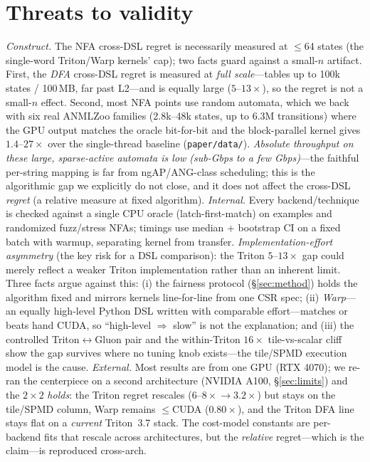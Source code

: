 \documentclass[conference]{IEEEtran}
\begin{document}
\section{Threats to validity}
\emph{Construct.} The NFA cross-DSL regret is necessarily measured at $\le$64 states (the
single-word Triton/Warp kernels' cap); two facts guard against a small-$n$ artifact. First, the
\emph{DFA} cross-DSL regret is measured at \emph{full scale}---tables up to 100k states / 100\,MB,
far past L2---and is equally large ($5$--$13\times$), so the regret is not a small-$n$ effect.
Second, most NFA points use random automata, which we back with six real ANMLZoo families
(2.8k--48k states, up to 6.3M transitions) where the GPU output matches the oracle bit-for-bit
and the block-parallel kernel gives $1.4$--$27\times$ over the single-thread baseline
(\texttt{paper/data/}).
\emph{Absolute throughput on these large, sparse-active automata is low (sub-Gbps to a few
Gbps)}---the faithful per-string mapping is far from ngAP/ANG-class scheduling; this is the
algorithmic gap we explicitly do not close, and it does not affect the cross-DSL \emph{regret}
(a relative measure at fixed algorithm). \emph{Internal.} Every backend/technique is checked against a
single CPU oracle (latch-first-match) on examples and randomized fuzz/stress NFAs; timings
use median + bootstrap CI on a fixed batch with warmup, separating kernel from transfer.
\emph{Implementation-effort asymmetry} (the key risk for a DSL comparison): the Triton
$5$--$13\times$ gap could merely reflect a weaker Triton implementation rather than an inherent
limit. Three facts argue against this: (i) the fairness protocol (\S\ref{sec:method}) holds the
algorithm fixed and mirrors kernels line-for-line from one CSR spec; (ii) \emph{Warp}---an
equally high-level Python DSL written with comparable effort---matches or beats hand CUDA, so
``high-level $\Rightarrow$ slow'' is not the explanation; and (iii) the controlled
Triton$\leftrightarrow$Gluon pair and the within-Triton $16\times$ tile-vs-scalar cliff show the
gap survives where no tuning knob exists---the tile/SPMD execution model is the cause. \emph{External.} Most results are from one GPU (RTX 4070); we re-ran the centerpiece on a second
architecture (NVIDIA A100, \S\ref{sec:limits}) and the $2\times2$ \emph{holds}: the Triton regret
rescales ($6$--$8\times\!\rightarrow\!3.2\times$) but stays on the tile/SPMD column, Warp remains
$\le$CUDA ($0.80\times$), and the Triton DFA line stays flat on a \emph{current} Triton~3.7 stack.
The cost-model constants are per-backend fits that rescale across architectures, but the
\emph{relative} regret---which is the claim---is reproduced cross-arch.
\end{document}
